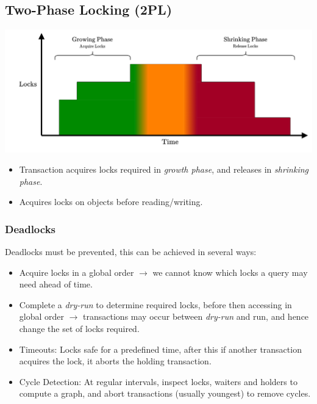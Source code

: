 \subsection{Two-Phase Locking (2PL)}
\begin{center}
    \includegraphics[width=.9\textwidth]{transactions/images/2_phase_locking.drawio.png}
\end{center}
\begin{itemize}
    \item Transaction acquires locks required in \textit{growth phase}, and releases in \textit{shrinking phase}.
    \item Acquires locks on objects before reading/writing.
\end{itemize}
\subsubsection{Deadlocks}
Deadlocks must be prevented, this can be achieved in several ways:
\begin{itemize}
    \item Acquire locks in a global order $\to$ we cannot know which locks a query may need ahead of time.
    \item Complete a \textit{dry-run} to determine required locks, before then accessing in global order $\to$ transactions may occur between \textit{dry-run} and run, and hence change the set of locks required.
    \item Timeouts: Locks safe for a predefined time, after this if another transaction acquires the lock, it aborts the holding transaction.
    \item Cycle Detection: At regular intervals, inspect locks, waiters and holders to compute a graph, and abort transactions (usually youngest) to remove cycles.
\end{itemize}


